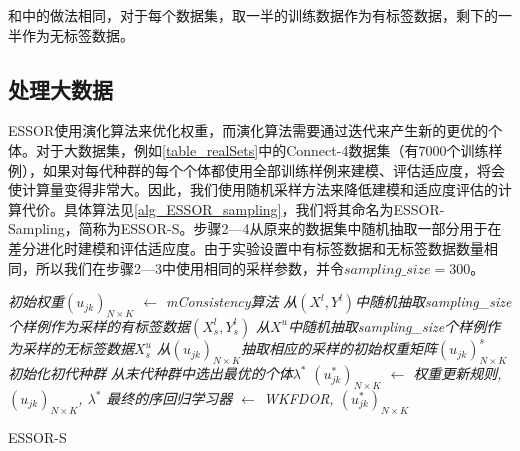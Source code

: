 和\label{wkfdor_realData}中的做法相同，对于每个数据集，取一半的训练数据作为有标签数据，剩下的一半作为无标签数据。

\subsection{处理大数据}
ESSOR使用演化算法来优化权重，而演化算法需要通过迭代来产生新的更优的个体。对于大数据集，例如\autoref{table_realSets}中的Connect-4数据集（有7000个训练样例），如果对每代种群的每个个体都使用全部训练样例来建模、评估适应度，将会使计算量变得非常大。因此，我们使用随机采样方法来降低建模和适应度评估的计算代价。具体算法见\autoref{alg_ESSOR_sampling}，我们将其命名为ESSOR-Sampling，简称为ESSOR-S。步骤2—4从原来的数据集中随机抽取一部分用于在差分进化时建模和评估适应度。由于实验设置中有标签数据和无标签数据数量相同，所以我们在步骤2—3中使用相同的采样参数，并令\(sampling\_size = 300\)。

\IncMargin{1em}
\begin{algorithm}
\emph{初始权重$(u_{jk})_{N \times K}$ $\leftarrow$ \textit{mConsistency}算法}\;
\emph{从$(X^{l},Y^{l})$中随机抽取sampling\_size个样例作为采样的有标签数据$(X_{s}^{l},Y_{s}^{l})$}\;
\emph{从$X^{u}$中随机抽取sampling\_size个样例作为采样的无标签数据$X_{s}^{u}$}\;
\emph{从$(u_{jk})_{N \times K}$抽取相应的采样的初始权重矩阵$(u_{jk})_{N \times K}^{s}$}\;
\emph{初始化初代种群}\;
\emph{从末代种群中选出最优的个体$\lambda^{*}$}\;
\emph{$(u_{jk}^{*})_{N \times K}$ $\leftarrow$ 权重更新规则, $(u_{jk})_{N \times K}$, $\lambda^{*}$}\;
\emph{最终的序回归学习器 $\leftarrow$ WKFDOR, $(u_{jk}^{*})_{N \times K}$}\;
\caption{ESSOR-S}\label{alg_ESSOR_sampling}
\end{algorithm}\DecMargin{1em}

